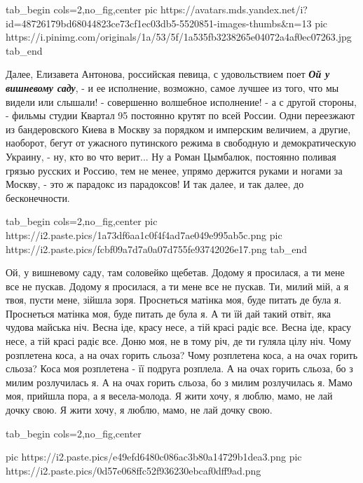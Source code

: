 \ifcmt
  tab_begin cols=2,no_fig,center
     pic https://avatars.mds.yandex.net/i?id=48726179bd68044823ce73cf1ec03db5-5520851-images-thumbs&n=13
     pic https://i.pinimg.com/originals/1a/53/5f/1a535fb3238265e04072a4af0ec07263.jpg
  tab_end
\fi

Далее, Елизавета Антонова, российская певица, с удовольствием поет
\textbf{\emph{Ой у вишневому саду}}, - и ее исполнение, возможно, самое лучшее
из того, что мы видели или слышали! - совершенно волшебное исполнение! - а с
другой стороны, - фильмы студии Квартал 95 постоянно крутят по всей России.
Одни переезжают из бандеровского Киева в Москву за порядком и имперским
величием, а другие, наоборот, бегут от ужасного путинского режима в свободную и
демократическую Украину, - ну, кто во что верит... Ну а Роман Цымбалюк,
постоянно поливая грязью русских и Россию, тем не менее, упрямо держится руками
и ногами за Москву, - это ж парадокс из парадоксов! И так далее, и так далее,
до бесконечности. 

\ifcmt
  tab_begin cols=2,no_fig,center
     pic https://i2.paste.pics/1a73df6aa1c0f4f4ad7ae049e995ab5c.png
     pic https://i2.paste.pics/fcbf09a7d7a0a07d755fe93742026e17.png
  tab_end
\fi

\raggedcolumns
\begin{multicols}{2} %
\setlength{\parindent}{0pt}
\obeycr
Ой, у вишневому саду, там соловейко щебетав.
Додому я просилася, а ти мене все не пускав.
Додому я просилася, а ти мене все не пускав.
\smallskip
Ти, милий мій, а я твоя, пусти мене, зійшла зоря.
Проснеться матінка моя, буде питать де була я.
Проснеться матінка моя, буде питать де була я.
\smallskip
А ти їй дай такий отвіт, яка чудова майська ніч.
Весна іде, красу несе, а тій красі радіє все.
Весна іде, красу несе, а тій красі радіє все.
\smallskip
Доню моя, не в тому річ, де ти гуляла цілу ніч.
Чому розплетена коса, а на очах горить сльоза?
Чому розплетена коса, а на очах горить сльоза?
\smallskip
Коса моя розплетена - її подруга розплела.
А на очах горить сльоза, бо з милим розлучилась я.
А на очах горить сльоза, бо з милим розлучилась я.
\smallskip
Мамо моя, прийшла пора, а я весела-молода.
Я жити хочу, я люблю, мамо, не лай дочку свою.
Я жити хочу, я люблю, мамо, не лай дочку свою.
\restorecr
\end{multicols} %

\ifcmt
  tab_begin cols=2,no_fig,center

     pic https://i2.paste.pics/e49efd6480c086ac3b80a14729b1dea3.png
     pic https://i2.paste.pics/0d57e068ffc52f936230ebcaf0dff9ad.png

